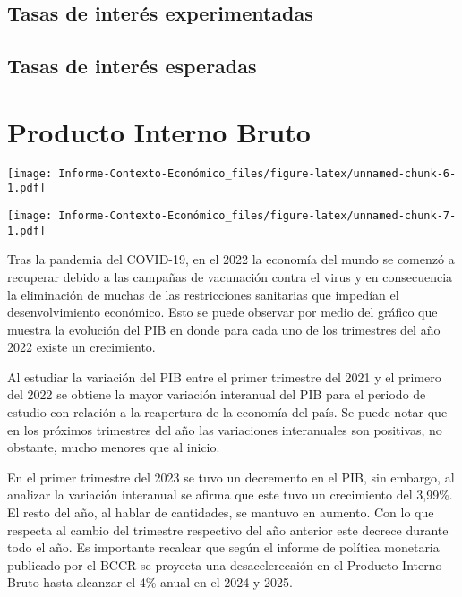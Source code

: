 \documentclass[
]{article}
\begin{document}
\hypertarget{tasas-de-interuxe9s-experimentadas}{%
\subsection{Tasas de interés
experimentadas}\label{tasas-de-interuxe9s-experimentadas}}

\hypertarget{tasas-de-interuxe9s-esperadas}{%
\subsection{Tasas de interés
esperadas}\label{tasas-de-interuxe9s-esperadas}}

\hypertarget{producto-interno-bruto}{%
\section{Producto Interno Bruto}\label{producto-interno-bruto}}

\texttt{[image: Informe-Contexto-Económico\_files/figure-latex/unnamed-chunk-6-1.pdf]}

\texttt{[image: Informe-Contexto-Económico\_files/figure-latex/unnamed-chunk-7-1.pdf]}

Tras la pandemia del COVID-19, en el 2022 la economía del mundo se
comenzó a recuperar debido a las campañas de vacunación contra el virus
y en consecuencia la eliminación de muchas de las restricciones
sanitarias que impedían el desenvolvimiento económico. Esto se puede
observar por medio del gráfico que muestra la evolución del PIB en donde
para cada uno de los trimestres del año 2022 existe un crecimiento.

Al estudiar la variación del PIB entre el primer trimestre del 2021 y el
primero del 2022 se obtiene la mayor variación interanual del PIB para
el periodo de estudio con relación a la reapertura de la economía del
país. Se puede notar que en los próximos trimestres del año las
variaciones interanuales son positivas, no obstante, mucho menores que
al inicio.

En el primer trimestre del 2023 se tuvo un decremento en el PIB, sin
embargo, al analizar la variación interanual se afirma que este tuvo un
crecimiento del 3,99\%. El resto del año, al hablar de cantidades, se
mantuvo en aumento. Con lo que respecta al cambio del trimestre
respectivo del año anterior este decrece durante todo el año. Es
importante recalcar que según el informe de política monetaria publicado
por el BCCR se proyecta una desacelerecaión en el Producto Interno Bruto
hasta alcanzar el 4\% anual en el 2024 y 2025.
\end{document}
